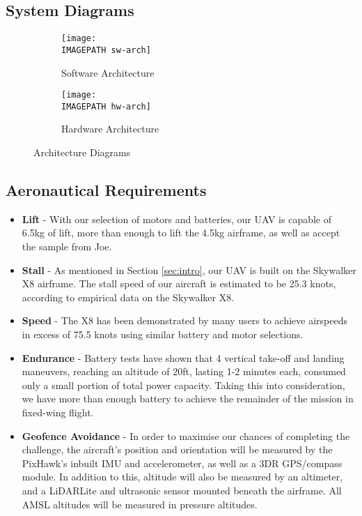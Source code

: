\subsection{System Diagrams}
\begin{figure}[H]	
	\begin{subfigure}{0.32\textwidth}
		\centerline{\texttt{[image: \\IMAGEPATH sw-arch]}}
		\caption{Software Architecture}
		\label{fig:sw-arch}
	\end{subfigure} %
	\begin{subfigure}{.93\textwidth}
		\centerline{\texttt{[image: \\IMAGEPATH hw-arch]}}
		\caption{Hardware Architecture}
		\label{fig:hw-arch}
	\end{subfigure}
	\caption{Architecture Diagrams}
	\label{fig:arch}
\end{figure}

\subsection{Aeronautical Requirements}
\begin{itemize}
	\item \textbf{Lift} - With our selection of motors and batteries, our UAV is capable of 6.5kg of lift, more than enough to lift the 4.5kg airframe, as well as accept the sample from Joe.
	\item \textbf{Stall} - As mentioned in Section \ref{sec:intro}, our UAV is built on the Skywalker X8 airframe. The stall speed of our aircraft is estimated to be 25.3 knots, according to empirical data on the Skywalker X8.
	\item \textbf{Speed} - The X8 has been demonstrated by many users to achieve airspeeds in excess of 75.5 knots using similar battery and motor selections.
	\item \textbf{Endurance} - Battery tests have shown that 4 vertical take-off and landing maneuvers, reaching an altitude of 20ft, lasting 1-2 minutes each, consumed only a small portion of total power capacity. Taking this into consideration, we have more than enough battery to achieve the remainder of the mission in fixed-wing flight.
	\item \textbf{Geofence Avoidance} - In order to maximise our chances of completing the challenge, the aircraft's position and orientation will be measured by the PixHawk's inbuilt IMU and accelerometer, as well as a 3DR GPS/compass module. In addition to this, altitude will also be measured by an altimeter, and a LiDARLite and ultrasonic sensor mounted beneath the airframe. All AMSL altitudes will be measured in pressure altitudes.
\end{itemize}

